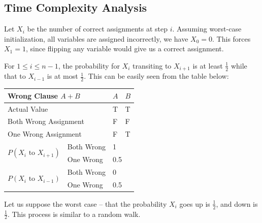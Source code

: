 \documentclass[11pt,fancychapters]{article}
\begin{document}
\subsection{Time Complexity Analysis}
Let $X_i$ be the number of correct assignments at step $i$. Assuming worst-case initialization, all variables are assigned incorrectly, we have $X_0 = 0$. This forces $X_1 = 1$, since flipping any variable would give us a correct assignment.\newline

For $1\le i \le n-1$, the probability for $X_i$ transiting to $X_{i+1}$ is at least $\frac{1}{2}$ while that to $X_{i-1}$ is at most $\frac{1}{2}$. This can be easily seen from the table below:

\begin{table}[H]
\centering
\begin{tabular}{|l|l|l|l|}
\hline
\multicolumn{2}{|l|}{Wrong Clause $A+B$}            & $A$           & $B$          \\ \hline
\multicolumn{2}{|l|}{Actual Value}                  & T           & T          \\ \hline
\multicolumn{2}{|l|}{Both Wrong Assignment}         & F           & F          \\ \hline
\multicolumn{2}{|l|}{One Wrong Assignment}          & F           & T          \\ \hline
\multirow{2}{*}{$P(X_i \text{ to } X_{i+1})$} & Both Wrong & \multicolumn{2}{l|}{1}   \\ \cline{2-4} 
                                       & One Wrong  & \multicolumn{2}{l|}{0.5} \\ \hline
\multirow{2}{*}{$P(X_i \text{ to } X_{i-1})$} & Both Wrong & \multicolumn{2}{l|}{0}   \\ \cline{2-4} 
                                       & One Wrong  & \multicolumn{2}{l|}{0.5} \\ \hline
\end{tabular}
\end{table}
Let us suppose the worst case – that the probability $X_i$ goes up is $\frac{1}{2}$, and down is $\frac{1}{2}$. This process is similar to a random walk.\newline
\end{document}
